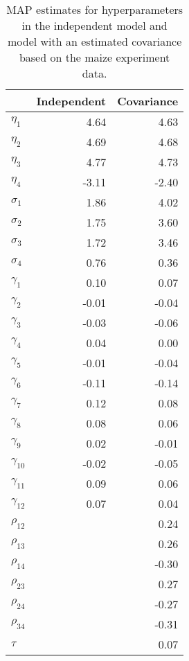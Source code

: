 \begin{table}[ht]
\centering
\caption{MAP estimates for hyperparameters in the independent model and model with an estimated covariance based on the maize experiment data.} 
\label{t:map}
\begin{tabular}{l|rr|}
  \hline
 & Independent & Covariance \\ 
  \hline
$\eta_1$ & 4.64 & 4.63 \\ 
  $\eta_2$ & 4.69 & 4.68 \\ 
  $\eta_3$ & 4.77 & 4.73 \\ 
  $\eta_4$ & -3.11 & -2.40 \\ 
   \hline
$\sigma_1$ & 1.86 & 4.02 \\ 
  $\sigma_2$ & 1.75 & 3.60 \\ 
  $\sigma_3$ & 1.72 & 3.46 \\ 
  $\sigma_4$ & 0.76 & 0.36 \\ 
   \hline
$\gamma_{1}$ & 0.10 & 0.07 \\ 
  $\gamma_{2}$ & -0.01 & -0.04 \\ 
  $\gamma_{3}$ & -0.03 & -0.06 \\ 
  $\gamma_{4}$ & 0.04 & 0.00 \\ 
  $\gamma_{5}$ & -0.01 & -0.04 \\ 
  $\gamma_{6}$ & -0.11 & -0.14 \\ 
  $\gamma_{7}$ & 0.12 & 0.08 \\ 
  $\gamma_{8}$ & 0.08 & 0.06 \\ 
  $\gamma_{9}$ & 0.02 & -0.01 \\ 
  $\gamma_{10}$ & -0.02 & -0.05 \\ 
  $\gamma_{11}$ & 0.09 & 0.06 \\ 
  $\gamma_{12}$ & 0.07 & 0.04 \\ 
   \hline
$\rho_{12}$ &  & 0.24 \\ 
  $\rho_{13}$ &  & 0.26 \\ 
  $\rho_{14}$ &  & -0.30 \\ 
  $\rho_{23}$ &  & 0.27 \\ 
  $\rho_{24}$ &  & -0.27 \\ 
  $\rho_{34}$ &  & -0.31 \\ 
   \hline
$\tau$ &  & 0.07 \\ 
   \hline
\end{tabular}
\end{table}
